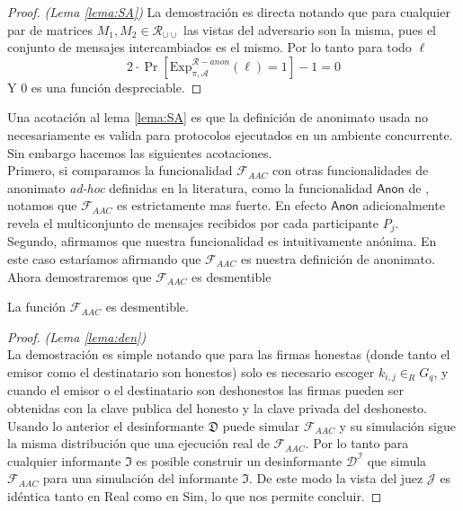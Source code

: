 \begin{proof}
\textit{(Lema \ref{lema:SA})}
La demostración es directa notando que para cualquier par de matrices $M_1, M_2 \in \mathcal{R}_{\cup\cup}$ las
vistas del adversario son la misma, pues el conjunto de mensajes intercambiados es el mismo. Por lo tanto para todo $\ell$
$$2\cdot\Pr[\mathrm{Exp}_{\pi, \mathcal{A}}^{\mathcal{R}-anon}(\ell) = 1] - 1 = 0$$
Y 0 es una función despreciable.
\end{proof}

Una acotación al lema \ref{lema:SA} es que la definición de anonimato usada no necesariamente es
valida para protocolos ejecutados en un ambiente concurrente. Sin embargo hacemos las siguientes
acotaciones.\\
Primero, si comparamos la funcionalidad $\mathcal{F}_{AAC}$ con otras funcionalidades
de anonimato \textit{ad-hoc} definidas en la literatura, como la funcionalidad $\mathsf{Anon}$ de
\cite{IshaiEtAl06}, notamos que $\mathcal{F}_{AAC}$ es estrictamente mas fuerte. En efecto
$\mathsf{Anon}$ adicionalmente revela el multiconjunto de mensajes recibidos por cada participante
$P_j$.\\
Segundo, afirmamos que nuestra funcionalidad es intuitivamente anónima. En este caso estaríamos
afirmando que $\mathcal{F}_{AAC}$ es nuestra definición de anonimato.\\

Ahora demostraremos que $\mathcal{F}_{AAC}$ es desmentible

\begin{lema}
La función $\mathcal{F}_{AAC}$ es desmentible.
\label{lema:den}
\end{lema}

\begin{proof}
\textit{(Lema \ref{lema:den})}\\
La demostración es simple notando que para las firmas honestas (donde tanto el emisor como el destinatario son
honestos) solo es necesario escoger $k_{i, j} \in_R G_q$, y cuando el emisor o el destinatario son deshonestos
las firmas pueden ser obtenidas con la clave publica del honesto y la clave privada del deshonesto. Usando
lo anterior el desinformante $\mathfrak{D}$ puede simular $\mathcal{F}_{AAC}$ y su simulación sigue la misma
distribución que una ejecución real de $\mathcal{F}_{AAC}$. Por lo tanto para cualquier informante $\mathfrak{I}$
es posible construir un desinformante $\mathcal{D^I}$ que simula $\mathcal{F}_{AAC}$ para una simulación
del informante $\mathfrak{I}$. De este modo la vista del juez $\mathcal{J}$ es idéntica tanto en Real como
en Sim, lo que nos permite concluir. 
\end{proof}

